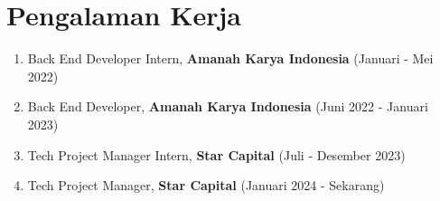 \section*{Pengalaman Kerja}
\begin{enumerate}
    \itemsep0em 
    \item Back End Developer Intern, \textbf{Amanah Karya Indonesia} (Januari - Mei 2022)
    \item Back End Developer, \textbf{Amanah Karya Indonesia} (Juni 2022 - Januari 2023)
    \item Tech Project Manager Intern, \textbf{Star Capital} (Juli - Desember 2023)
    \item Tech Project Manager, \textbf{Star Capital} (Januari 2024 - Sekarang)
\end{enumerate}

